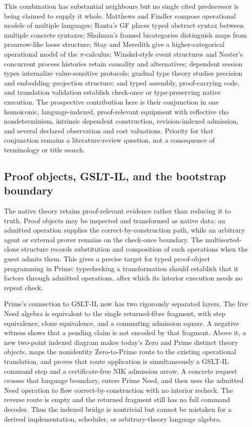 \documentclass[11pt]{article}
\begin{document}
This combination has substantial neighbours but no single cited predecessor is
being claimed to supply it whole.  Matthews and Findler compose operational
models of multiple languages; Ranta's GF places typed abstract syntax between
multiple concrete syntaxes; Shulman's framed bicategories distinguish maps from
proarrow-like loose structure; Stay and Meredith give a higher-categorical
operational model of the $\pi$-calculus; Winskel-style event structures and
Nester's concurrent process histories retain causality and alternatives;
dependent session types internalize value-sensitive protocols; gradual type
theory studies precision and embedding--projection structure; and typed assembly,
proof-carrying code, and translation validation establish check-once or
type-preserving native execution.  The prospective contribution here is their
conjunction in one homoiconic, language-indexed, proof-relevant equipment with
reflective rho nondeterminism, intrinsic dependent construction,
revision-indexed admission, and several declared observation and cost
valuations.  Priority for that conjunction remains a literature-review question,
not a consequence of terminology or title search.

\subsection{Proof objects, GSLT-IL, and the bootstrap boundary}

The native theory retains proof-relevant evidence rather than reducing it to
truth.  Proof objects may be inspected and transformed as native data; an admitted
operation supplies the correct-by-construction path, while an arbitrary agent or
external prover remains on the check-once boundary.  The multisorted-clone
structure records substitution and composition of such operations when the guest
admits them.  This gives a precise target for typed proof-object programming in
Prime: typechecking a transformation should establish that it factors through
admitted operations, after which its interior execution needs no repeat check.

Prime's connection to GSLT-IL now has two rigorously separated layers.  The live
Need algebra is equivalent to the single returned-fibre fragment, with step
equivalence, clone equivalence, and a commuting admission square.  A negative
witness shows that a pending claim is not encoded by that fragment.  Above it, a
new two-point indexed diagram makes today's Zero and Prime distinct theory
objects, maps the nonidentity Zero-to-Prime route to the existing operational
translation, and proves that route application is simultaneously a GSLT-IL
command step and a certificate-free NIK admission arrow.  A concrete request
crosses that language boundary, enters Prime Need, and then uses the admitted
Need operation to flow correct-by-construction with no interior recheck.  The
reverse route is empty and the returned fragment still has no full command
decoder.  Thus the indexed bridge is nontrivial but cannot be mistaken for a
derived implementation, scheduler, or arbitrary-theory language algebra.
\end{document}
